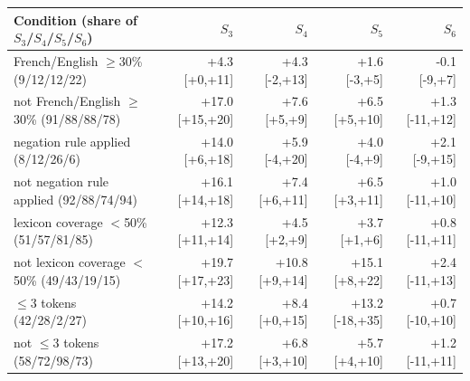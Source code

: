 \begin{tabular}{@{}lrrrr@{}}\toprule
Condition (share of $S_3$/$S_4$/$S_5$/$S_6$) & $S_3$ & $S_4$ & $S_5$ & $S_6$\\\midrule
French/English $\ge$30\% (9/12/12/22) & +4.3 \scriptsize[+0,+11] & +4.3 \scriptsize[-2,+13] & +1.6 \scriptsize[-3,+5] & -0.1 \scriptsize[-9,+7]\\
not French/English $\ge$30\% (91/88/88/78) & +17.0 \scriptsize[+15,+20] & +7.6 \scriptsize[+5,+9] & +6.5 \scriptsize[+5,+10] & +1.3 \scriptsize[-11,+12]\\
negation rule applied (8/12/26/6) & +14.0 \scriptsize[+6,+18] & +5.9 \scriptsize[-4,+20] & +4.0 \scriptsize[-4,+9] & +2.1 \scriptsize[-9,+15]\\
not negation rule applied (92/88/74/94) & +16.1 \scriptsize[+14,+18] & +7.4 \scriptsize[+6,+11] & +6.5 \scriptsize[+3,+11] & +1.0 \scriptsize[-11,+10]\\
lexicon coverage $<$50\% (51/57/81/85) & +12.3 \scriptsize[+11,+14] & +4.5 \scriptsize[+2,+9] & +3.7 \scriptsize[+1,+6] & +0.8 \scriptsize[-11,+11]\\
not lexicon coverage $<$50\% (49/43/19/15) & +19.7 \scriptsize[+17,+23] & +10.8 \scriptsize[+9,+14] & +15.1 \scriptsize[+8,+22] & +2.4 \scriptsize[-11,+13]\\
$\le$3 tokens (42/28/2/27) & +14.2 \scriptsize[+10,+16] & +8.4 \scriptsize[+0,+15] & +13.2 \scriptsize[-18,+35] & +0.7 \scriptsize[-10,+10]\\
not $\le$3 tokens (58/72/98/73) & +17.2 \scriptsize[+13,+20] & +6.8 \scriptsize[+3,+10] & +5.7 \scriptsize[+4,+10] & +1.2 \scriptsize[-11,+11]\\
\bottomrule\end{tabular}

